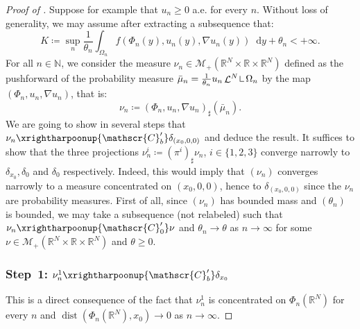 \documentclass[JEP,XML,SOM,Unicode,published]{cedram}
\theoremstyle{plain}
\theoremstyle{definition}
\newcommand{\dd}{\mathop{}\mathopen{}\mathrm{d}}
\newcommand{\N}{\mathbb{N}}
\newcommand{\R}{\mathbb{R}}
\newcommand{\Cspace}{\mathscr{C}}
\newcommand{\Mspace}{\mathscr{M}}
\newcommand{\mres}{\mathop{\hbox{\vrule height 6pt width .5pt depth 0pt \vrule height .5pt width 4pt depth 0pt}}\nolimits}
\DeclareMathOperator{\lbm}{\mathcal{L}}
\DeclareMathOperator{\dist}{dist}
\newcommand{\mweakto}{\xrightharpoonup{\Cspace_0'}}
\newcommand{\narrowto}{\xrightharpoonup{\Cspace_b'}}
\begin{document}
\begin{proof}[Proof of ]
Suppose for example that $u_n \geq 0$ a.e. for every $n$. Without loss of generality, we may assume after extracting a subsequence that:
\begin{equation}\label{boundEnergyMass}
K \coloneqq \sup_n \frac 1{\theta_n} \int_{\Omega_n} f(\Phi_n(y), u_n(y), \nabla u_n(y))\dd y + \theta_n < +\infty.
\end{equation}
For all $n\in\N$, we consider the measure $\nu_n\in \Mspace_+(\R^N \times \R \times \R^N)$ defined as the pushforward of the probability measure $\bar\mu_n = \frac 1{\theta_n}u_n \lbm^N \mres \Omega_n$ by the map $(\Phi_n, u_n,\nabla u_n)$, that is:
\[\nu_n \coloneqq (\Phi_n, u_n,\nabla u_n)_\sharp (\bar\mu_n).\]
We are going to show in several steps that $\nu_n \narrowto \delta_{(x_0,0,0)}$ and deduce the result. It suffices to show that the three projections $\nu^i_n \coloneqq (\pi^i)_\sharp \nu_n$, $i\in\{1,2,3\}$ converge narrowly to $\delta_{x_0}, \delta_0$ and $\delta_0$ respectively. Indeed, this would imply that $(\nu_n)$ converges narrowly to a measure concentrated on $(x_0,0,0)$, hence to $\delta_{(x_0,0,0)}$ since the $\nu_n$ are probability measures. First of all, since $(\nu_n)$ has bounded mass and $(\theta_n)$ is bounded, we may take a subsequence (not relabeled) such that $\nu_n \mweakto \nu $ and $\theta_n \to \theta$ as \(n\to\infty\) for some $\nu \in \Mspace_+(\R^N \times \R\times \R^N)$ and $\theta \geq 0$.

\subsubsection*{Step~1: $\nu_n^1 \narrowto \delta_{x_0}$} This is a direct consequence of the fact that $\nu_n^1$ is concentrated on $\Phi_n(\R^N)$ for every $n$ and $\dist(\Phi_n(\R^N),x_0) \to 0$ as \(n\to\infty\).


\end{proof}
\end{document}
